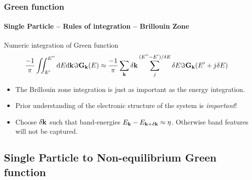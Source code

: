 \begin{frame}
  \frametitle{Green function}
  \framesubtitle{Single Particle -- Rules of integration -- Brillouin Zone}


  \begin{block}{Numeric integration of Green function}
    \small 
    \begin{equation*}
      \frac{-1}\pi\iint_{E'}^{E''} \mathrm{d} E\mathrm{d} \mathbf{k}\Im \mathbf{G}_{\mathbf{k}}(E) \approx \frac{-1}\pi
      \sum_{\mathbf{k}}\delta\mathbf{k}\sum_j^{(E''-E')/\delta E} \delta E \Im \mathbf{G}_{\mathbf{k}}(E'+j\delta E)
    \end{equation*}

    \begin{itemize}
      \item%
      The Brillouin zone integration is just as important as the energy integration.

      \item%
      Prior understanding of the electronic structure of the system is \emph{important}! 

      \item<2->%
      Choose $\delta\mathbf{k}$ such that band-energies $E_{\mathbf{k}} -
      E_{\mathbf{k}+\delta\mathbf{k}}\approx \eta$. Otherwise band features will not be captured.
      
    \end{itemize}
    
  \end{block}

\end{frame}


\subsection{Single Particle to Non-equilibrium Green function}

